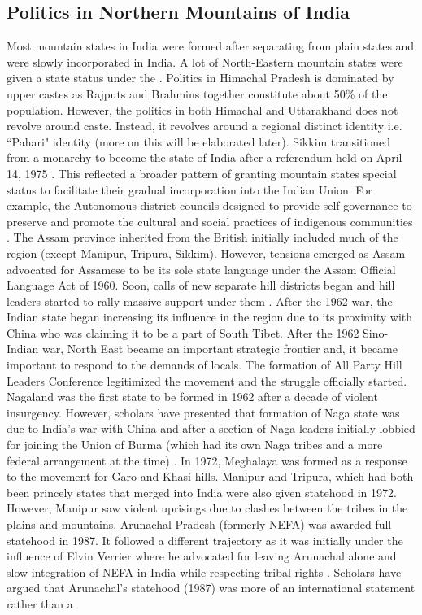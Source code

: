 \begin{sloppypar}
\subsection{Politics in Northern Mountains of India}

Most mountain states in India were formed after separating from plain states and were slowly incorporated in India. A lot of North-Eastern mountain states were given a state status under the \cite{North_eastern_reorg_1971}.  Politics in Himachal Pradesh is dominated by upper castes as  Rajputs and Brahmins together constitute about 50\% of the population. However, the politics in both Himachal and Uttarakhand does not revolve around caste. Instead, it revolves around a regional distinct identity i.e. ``Pahari" identity \citep{mishra2000politics} (more on this will be elaborated later). Sikkim transitioned from a monarchy to become the  state of India after a referendum held on April 14, 1975 \citep{code1979volume}. This reflected a broader pattern of granting mountain states special status to facilitate their gradual incorporation into the Indian Union. For example, the Autonomous district councils  designed to provide self-governance to preserve and promote the cultural and social practices of indigenous communities \citep{pautunthang2024india}. The Assam province inherited from the British initially included much of the region (except Manipur, Tripura, Sikkim). However, tensions emerged as Assam advocated for Assamese to be its sole state language under the Assam Official Language Act of 1960. Soon, calls of new separate hill districts began and hill leaders started to rally massive support under them \citep{inoue2005integration}.  After the 1962 war, the Indian state began increasing its influence in the region due to its proximity with China who was claiming it to be a part of South Tibet. After the 1962 Sino-Indian war, North East became an important strategic frontier and, it became important to respond to the demands of locals. The formation of All Party Hill Leaders Conference legitimized the movement and the struggle officially started. Nagaland was the first state to be formed in 1962 after a decade of violent insurgency. However, scholars have presented that formation of Naga state was due to India's war with China and after a section of Naga leaders initially lobbied for joining the Union of Burma (which had its own Naga tribes and a more federal arrangement at the time) \citep{Wouters_2023,johari1975creation}.  In 1972, Meghalaya was formed as a response to the movement for Garo and Khasi hills. Manipur and Tripura, which had both been princely states that merged into India were also given statehood in 1972. However, Manipur saw violent uprisings due to clashes between the tribes in the plains and mountains. Arunachal Pradesh (formerly NEFA) was awarded full statehood in 1987. It followed a different trajectory as it was initially under the influence of Elvin Verrier where he advocated for leaving Arunachal alone and slow integration of NEFA in India while respecting tribal rights \citep{verrier_elvin_2008}.  Scholars have argued that Arunachal’s statehood (1987) was  more of an international statement rather than a 
\end{sloppypar}
